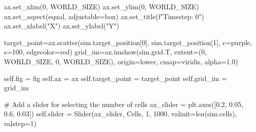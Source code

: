 \documentclass[
  letterpaper,
  DIV=11,
  numbers=noendperiod]{scrreprt}
\newenvironment{Shaded}{\begin{snugshade}}{\end{snugshade}}
\newcommand{\BuiltInTok}[1]{\textcolor[rgb]{0.00,0.23,0.31}{#1}}
\newcommand{\CommentTok}[1]{\textcolor[rgb]{0.37,0.37,0.37}{#1}}
\newcommand{\DecValTok}[1]{\textcolor[rgb]{0.68,0.00,0.00}{#1}}
\newcommand{\FloatTok}[1]{\textcolor[rgb]{0.68,0.00,0.00}{#1}}
\newcommand{\NormalTok}[1]{\textcolor[rgb]{0.00,0.23,0.31}{#1}}
\newcommand{\OperatorTok}[1]{\textcolor[rgb]{0.37,0.37,0.37}{#1}}
\newcommand{\SpecialStringTok}[1]{\textcolor[rgb]{0.13,0.47,0.30}{#1}}
\newcommand{\StringTok}[1]{\textcolor[rgb]{0.13,0.47,0.30}{#1}}
\newcommand{\VariableTok}[1]{\textcolor[rgb]{0.07,0.07,0.07}{#1}}
\theoremstyle{definition}
\theoremstyle{remark}
\begin{document}
\begin{tcolorbox}
\begin{Shaded}
\begin{Highlighting}[]
\NormalTok{        ax.set\_xlim(}\DecValTok{0}\NormalTok{, WORLD\_SIZE)}
\NormalTok{        ax.set\_ylim(}\DecValTok{0}\NormalTok{, WORLD\_SIZE)}
\NormalTok{        ax.set\_aspect(}\StringTok{\textquotesingle{}equal\textquotesingle{}}\NormalTok{, adjustable}\OperatorTok{=}\StringTok{\textquotesingle{}box\textquotesingle{}}\NormalTok{)}
\NormalTok{        ax.set\_title(}\SpecialStringTok{f"Timestep: 0"}\NormalTok{)}
\NormalTok{        ax.set\_xlabel(}\StringTok{"X"}\NormalTok{)}
\NormalTok{        ax.set\_ylabel(}\StringTok{"Y"}\NormalTok{)}

\NormalTok{        target\_point}\OperatorTok{=}\NormalTok{ax.scatter(sim.target\_position[}\DecValTok{0}\NormalTok{], sim.target\_position[}\DecValTok{1}\NormalTok{], c}\OperatorTok{=}\StringTok{\textquotesingle{}purple\textquotesingle{}}\NormalTok{, s}\OperatorTok{=}\DecValTok{100}\NormalTok{, edgecolor}\OperatorTok{=}\StringTok{\textquotesingle{}red\textquotesingle{}}\NormalTok{)}
\NormalTok{        grid\_im}\OperatorTok{=}\NormalTok{ax.imshow(sim.grid.T, extent}\OperatorTok{=}\NormalTok{(}\DecValTok{0}\NormalTok{, WORLD\_SIZE, }\DecValTok{0}\NormalTok{, WORLD\_SIZE), origin}\OperatorTok{=}\StringTok{\textquotesingle{}lower\textquotesingle{}}\NormalTok{, cmap}\OperatorTok{=}\StringTok{\textquotesingle{}viridis\textquotesingle{}}\NormalTok{, alpha}\OperatorTok{=}\FloatTok{1.0}\NormalTok{)}

        \VariableTok{self}\NormalTok{.fig }\OperatorTok{=}\NormalTok{ fig}
        \VariableTok{self}\NormalTok{.ax }\OperatorTok{=}\NormalTok{ ax}
        \VariableTok{self}\NormalTok{.target\_point }\OperatorTok{=}\NormalTok{ target\_point}
        \VariableTok{self}\NormalTok{.grid\_im }\OperatorTok{=}\NormalTok{ grid\_im}

        \CommentTok{\# Add a slider for selecting the number of cells}
\NormalTok{        ax\_slider }\OperatorTok{=}\NormalTok{ plt.axes([}\FloatTok{0.2}\NormalTok{, }\FloatTok{0.05}\NormalTok{, }\FloatTok{0.6}\NormalTok{, }\FloatTok{0.03}\NormalTok{])}
        \VariableTok{self}\NormalTok{.slider }\OperatorTok{=}\NormalTok{ Slider(ax\_slider, }\StringTok{\textquotesingle{}Cells\textquotesingle{}}\NormalTok{, }\DecValTok{1}\NormalTok{, }\DecValTok{1000}\NormalTok{, valinit}\OperatorTok{=}\BuiltInTok{len}\NormalTok{(sim.cells), valstep}\OperatorTok{=}\DecValTok{1}\NormalTok{)}


\end{Highlighting}
\end{Shaded}
\end{tcolorbox}
\end{document}
